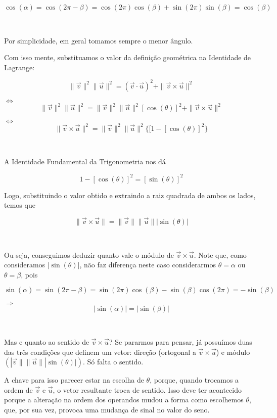 \[
\cos(\alpha) = \cos(2\pi - \beta) = \cos(2\pi)\cos(\beta) + \sin(2\pi)\sin(\beta) = \cos(\beta)
\]

 

Por simplicidade, em geral tomamos sempre o menor ângulo.




Com isso mente, substituamos o valor da definição geométrica na Identidade de Lagrange:

\[
\|\vec{v}\|^2\|\vec{u}\|^2 = (\vec{v} \cdot \vec{u})^2 + \|\vec{v} \times \vec{u}\|^2
\]

\(\Longleftrightarrow\) \[
\|\vec{v}\|^2\|\vec{u}\|^2 = \|\vec{v}\|^2\|\vec{u}\|^2[\cos(\theta)]^2 + \|\vec{v} \times \vec{u}\|^2
\]

\(\Longleftrightarrow\) \[
\|\vec{v} \times \vec{u}\|^2 = \|\vec{v}\|^2\|\vec{u}\|^2\{[1 - [\cos(\theta)]^2 \}
\]

 

A Identidade Fundamental da Trigonometria nos dá 

\[
1 - [\cos(\theta)]^2 = [\sin(\theta)]^2
\]

Logo, substituindo o valor obtido e extraindo a raiz quadrada de ambos os lados, temos que

\[
\|\vec{v} \times \vec{u}\| = \|\vec{v}\|\|\vec{u}\||\sin(\theta)|
\]

 

Ou seja, conseguimos deduzir quanto vale o módulo de \(\vec{v} \times \vec{u}\). Note que, como consideramos \(|\sin(\theta)|\), não faz diferença neste caso considerarmos \(\theta = \alpha\) ou \(\theta = \beta\), pois

\[
\sin(\alpha) = \sin(2\pi - \beta) = \sin(2\pi)\cos(\beta) - \sin(\beta)\cos(2\pi) = - \sin(\beta)
\]

\( \Longrightarrow \) \[
|\sin(\alpha)| = |\sin(\beta)|
\]

 

Mas e quanto ao sentido de \(\vec{v} \times \vec{u}\)? Se pararmos para pensar, já possuímos duas das três condições que definem um vetor: direção (ortogonal a \(\vec{v} \times \vec{u}\)) e módulo \(\left(|\vec{v}\|\|\vec{u}\||\sin(\theta)|\right)\). Só falta o sentido.

A chave para isso parecer estar na escolha de \(\theta\), porque, quando trocamos a ordem de \(\vec{v}\) e \(\vec{u}\), o vetor resultante troca de sentido. Isso deve ter acontecido porque a alteração na ordem dos operandos mudou a forma como escolhemos \(\theta\), que, por sua vez, provoca uma mudança de sinal no valor do seno.




